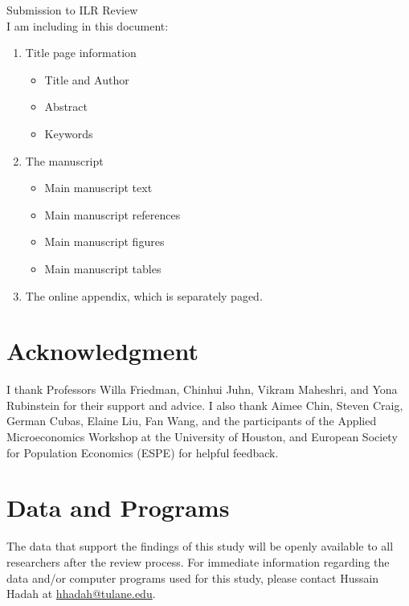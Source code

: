 \documentclass[12pt,english]{article}
\begin{document}
\thispagestyle{empty}
\begingroup
  \doublespacing
  \centering
  \LARGE Submission to ILR Review \\[0.25em]
\endgroup
I am including in this document:
\begin{enumerate}
    \item Title page information
    \begin{itemize}
        \item Title and Author
        \item Abstract
        \item Keywords
    \end{itemize}
    \item The manuscript
    \begin{itemize}
        \item Main manuscript text
        \item Main manuscript references
        \item Main manuscript figures
        \item Main manuscript tables
    \end{itemize}    
    \item The online appendix, which is separately paged.
\end{enumerate}

\section*{Acknowledgment}
I thank Professors Willa Friedman, Chinhui Juhn, Vikram Maheshri, and Yona Rubinstein for their support and advice. I also thank Aimee Chin, Steven Craig, German Cubas, Elaine Liu, Fan Wang, and the participants of the Applied Microeconomics Workshop at the University of Houston, and European Society for Population Economics (ESPE) for helpful feedback.

\section*{Data and Programs}

The data that support the findings of this study will be openly available to all researchers after the review process. For immediate information regarding the data and/or computer programs used for this study, please contact Hussain Hadah at \href{mailto:hhadah@tulane.edu}{hhadah@tulane.edu}.

\clearpage
\end{document}
